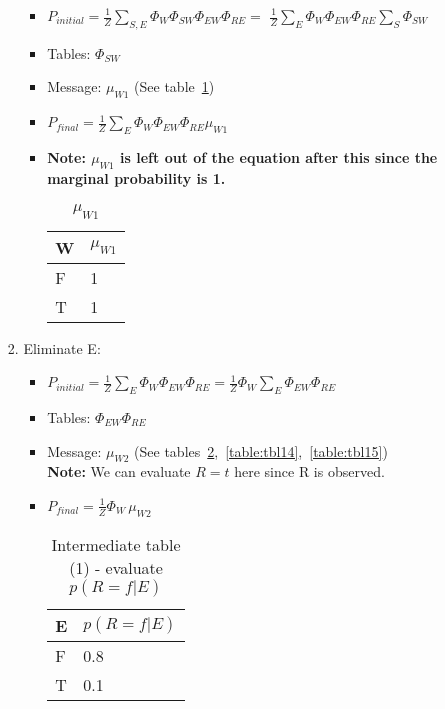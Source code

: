\documentclass{article}
\begin{document}
\begin{enumerate}[label=(\alph*)]
\begin{enumerate}[label=\roman*.]
\begin{enumerate}[label=\alph*.]
\begin{itemize}
\item $P_{initial}=\frac{1}{Z}\sum_{S,E}\Phi_{W}\Phi_{SW}\Phi_{EW}\Phi_{RE}=$
$\frac{1}{Z}\sum_{E}\Phi_{W}\Phi_{EW}\Phi_{RE}\sum_S\Phi_{SW}$ 

\item Tables: $\Phi_{SW}$

\item Message: $\mu_{W1}$ (See table~\ref{table:tbl12})

\item $P_{final}=\frac{1}{Z}\sum_{E}\Phi_{W}\Phi_{EW}\Phi_{RE}\mu_{W1}$

\item \textbf{Note:  $\mu_{W1}$ is left out of the equation after this since the marginal probability is 1.}

\begin{table}[h]
\centering
\caption{$\mu_{W1}$}
\label{table:tbl12}
\begin{tabular}{|l|l|}
\hline
 W & $\mu_{W1}$   \\
\hline \hline
 F & 1  \\
 T & 1  \\
\hline
\end{tabular}
\end{table}

\end{itemize}


\item Eliminate E:

\begin{itemize}

\item $P_{initial}=\frac{1}{Z}\sum_{E}\Phi_{W}\Phi_{EW}\Phi_{RE} = \frac{1}{Z}\Phi_{W}\sum_{E}\Phi_{EW}\Phi_{RE}$

\item Tables: $\Phi_{EW}\Phi_{RE}$

\item Message: $\mu_{W2}$ (See tables~\ref{table:tbl13},~\ref{table:tbl14},~\ref{table:tbl15}) \\
\textbf{Note:} We can evaluate $R=t$ here since R is observed.

\item  $P_{final}=\frac{1}{Z}\Phi_{W}\,\mu_{W2}$

\begin{table}[h]
\centering
\caption{Intermediate table (1) - evaluate $p(R=f|E)$}
\label{table:tbl13}
\begin{tabular}{|l|l|}
\hline
 E & $p(R=f|E)$   \\
\hline \hline
 F & 0.8  \\
 T & 0.1  \\
\hline
\end{tabular}
\end{table}


\end{itemize}
\end{enumerate}
\end{enumerate}
\end{enumerate}
\end{document}
